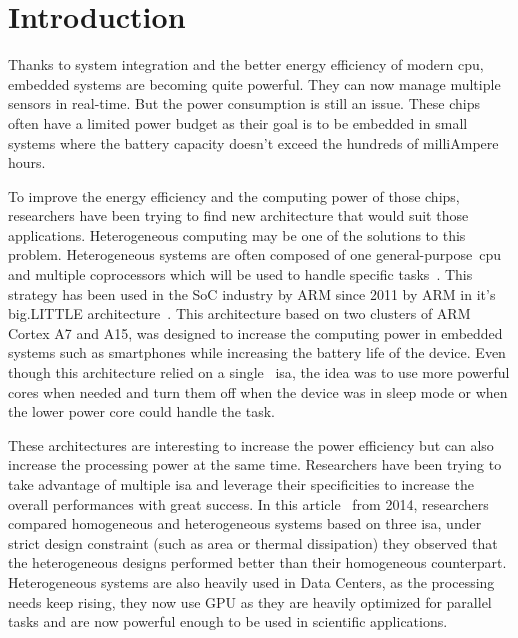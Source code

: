 
\chapter{Introduction}

    Thanks to system integration and the better energy efficiency of modern \gls{cpu}, embedded systems are becoming quite powerful. They can now manage multiple sensors in real-time. But the power consumption is still an issue. These chips often have a limited power budget as their goal is to be embedded in small systems where the battery capacity doesn't exceed the hundreds of milliAmpere hours. 

    To improve the energy efficiency and the computing power of those chips, researchers have been trying to find new architecture that would suit those applications. Heterogeneous computing may be one of the solutions to this problem. Heterogeneous systems are often composed of one general-purpose~\gls{cpu} and multiple coprocessors which will be used to handle specific tasks~\cite{Art:HeteroStrat}. This strategy has been used in the SoC industry by ARM since 2011 by ARM in it's big.LITTLE architecture~\cite{Art:bigLITTLE}. This architecture based on two clusters of ARM Cortex A7 and A15, was designed to increase the computing power in embedded systems such as smartphones while increasing the battery life of the device. Even though this architecture relied on a single~ \gls{isa}, the idea was to use more powerful cores when needed and turn them off when the device was in sleep mode or when the lower power core could handle the task. 


    These architectures are interesting to increase the power efficiency but can also increase the processing power at the same time. Researchers have been trying to take advantage of multiple \gls{isa} and leverage their specificities to increase the overall performances with great success. In this article~\cite{Art:Harnessing} from 2014, researchers compared homogeneous and heterogeneous systems based on three \gls{isa}, under strict design constraint (such as area or thermal dissipation) they observed that the heterogeneous designs performed better than their homogeneous counterpart. Heterogeneous systems are also heavily used in Data Centers, as the processing needs keep rising, they now use GPU as they are heavily optimized for parallel tasks and are now powerful enough to be used in scientific applications.

